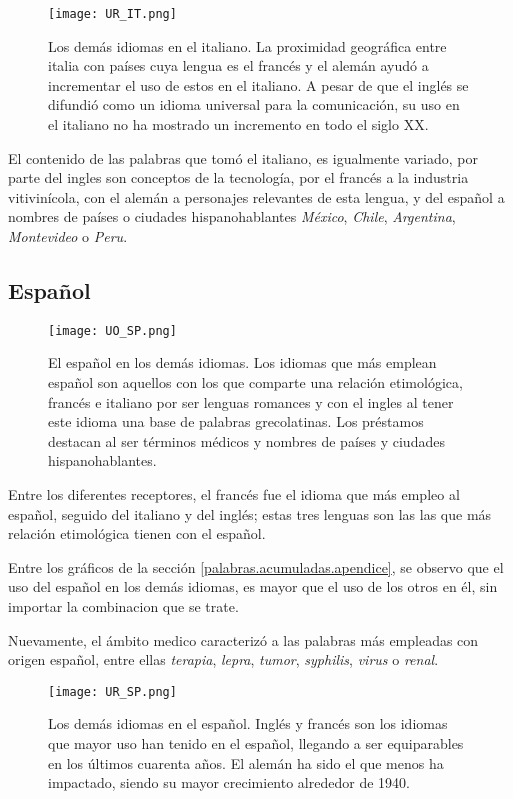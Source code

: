 \begin{figure}%
	\centering
	\texttt{[image: UR\_IT.png]}
	\label{fig.ST_b_IT}
	\caption{Los demás idiomas en el italiano. La proximidad geográfica  entre italia con países cuya lengua es el francés y el alemán ayudó a incrementar el uso de estos en el italiano. A pesar de que el inglés se difundió como un idioma universal para la comunicación, su uso en el italiano no ha mostrado un incremento en todo el siglo XX. }
\end{figure}

El contenido de las palabras que tomó el italiano, es igualmente variado, por parte del ingles son conceptos de la tecnología, por el francés a la industria vitivinícola, con el alemán a personajes relevantes de esta lengua, y del español a nombres de países o ciudades hispanohablantes \textit{México}, \textit{Chile}, \textit{Argentina}, \textit{Montevideo} o \textit{Peru}. 



\subsection{Español} %

\begin{figure}[h!] %
	\centering
	\texttt{[image: UO\_SP.png]}
	\label{fig.ST_a_SP}
	\caption{El español en los demás idiomas. Los idiomas que más emplean español son aquellos con los que comparte una relación etimológica, francés e italiano por ser lenguas romances y con el ingles al tener este idioma una base de palabras grecolatinas.  Los préstamos destacan al ser términos médicos y nombres de países y ciudades hispanohablantes.   }
\end{figure}

Entre los diferentes receptores, el francés fue el idioma que más empleo al español, seguido del italiano y del inglés; estas tres lenguas son las las que más relación etimológica tienen con el español.  

Entre los gráficos de la sección \ref{palabras.acumuladas.apendice}, se observo que el uso del español en los demás idiomas, es mayor que el uso de los otros en él, sin importar la combinacion que se trate.

Nuevamente,  el ámbito medico caracterizó a las palabras más empleadas con origen español, entre ellas \textit{terapia}, \textit{lepra}, \textit{tumor}, \textit{syphilis}, \textit{virus} o \textit{renal}. 

		
\begin{figure}[h!] %
	\centering
	\texttt{[image: UR\_SP.png]}
	\label{fig.ST_b_SP}
	\caption{Los demás idiomas en el español. Inglés y francés son los idiomas que mayor uso han tenido en el español, llegando a ser equiparables en los últimos cuarenta años. El alemán ha sido el que menos ha impactado, siendo su mayor crecimiento  alrededor de 1940.}
\end{figure}


